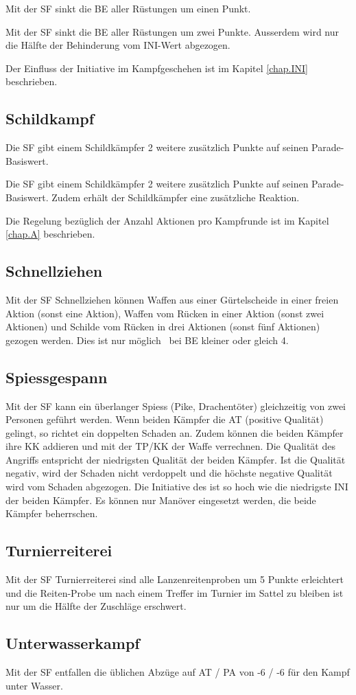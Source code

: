 Mit der SF  sinkt die BE aller Rüstungen um
einen Punkt.

Mit der SF  sinkt die BE aller Rüstungen um
zwei Punkte. Ausserdem wird nur die Hälfte der Behinderung vom INI-Wert
abgezogen.

Der Einfluss der Initiative im Kampfgeschehen ist im Kapitel \ref{chap.INI}
beschrieben.

\subsection{Schildkampf}
Die SF  gibt einem Schildkämpfer 2 weitere
zusätzlich Punkte auf seinen Parade-Basiswert.

Die SF  gibt einem Schildkämpfer 2 weitere
zusätzlich Punkte auf seinen Parade-Basiswert. Zudem erhält der Schildkämpfer
eine zusätzliche Reaktion.

Die Regelung bezüglich der Anzahl Aktionen pro Kampfrunde ist im Kapitel
\ref{chap.A} beschrieben.

\subsection{Schnellziehen}
Mit der SF Schnellziehen können Waffen aus einer Gürtelscheide in einer freien
Aktion (sonst eine Aktion), Waffen vom Rücken in einer Aktion (sonst zwei
Aktionen) und Schilde vom Rücken in drei Aktionen (sonst fünf Aktionen) gezogen
werden. Dies ist nur möglich \ bei BE kleiner oder gleich 4.

\subsection{Spiessgespann}
Mit der SF  kann ein überlanger Spiess (Pike,
Drachentöter) gleichzeitig von zwei Personen geführt werden. Wenn beiden
Kämpfer die AT (positive Qualität) gelingt, so richtet ein
 doppelten Schaden an.  Zudem können die beiden
Kämpfer ihre KK addieren und mit der TP/KK der Waffe verrechnen. Die Qualität
des Angriffs entspricht der niedrigsten Qualität der beiden Kämpfer. Ist die
Qualität negativ, wird der Schaden nicht verdoppelt und die höchste negative
Qualität wird vom Schaden abgezogen. Die Initiative des
 ist so hoch wie die niedrigste INI der beiden
Kämpfer. Es können nur Manöver eingesetzt werden, die beide Kämpfer
beherrschen.

\subsection{Turnierreiterei}
Mit der SF Turnierreiterei sind alle Lanzenreitenproben um 5 Punkte erleichtert
und die Reiten-Probe um nach einem Treffer im Turnier im Sattel zu bleiben ist
nur um die Hälfte der Zuschläge erschwert.

\subsection{Unterwasserkampf}
Mit der SF  entfallen die üblichen Abzüge auf AT
/ PA von -6 / -6 für den Kampf unter Wasser.
